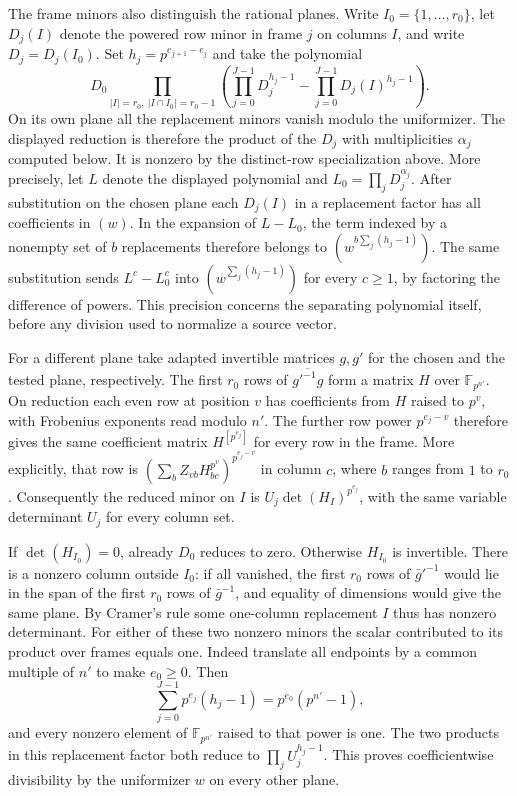 \documentclass[11pt]{amsart}
\theoremstyle{definition}
\theoremstyle{remark}
\begin{document}
The frame minors also distinguish the rational planes. Write
$I_0=\{1,\ldots,r_0\}$, let $D_j(I)$ denote the powered row
minor in frame $j$ on columns $I$, and write $D_j=D_j(I_0)$.
Set $h_j=p^{e_{j+1}-e_j}$ and take the polynomial
\[
 D_0\prod_{|I|=r_0,\ |I\cap I_0|=r_0-1}
 \left(\prod_{j=0}^{J-1}D_j^{h_j-1}
       -\prod_{j=0}^{J-1}D_j(I)^{h_j-1}\right).
\]
On its own plane all the replacement minors vanish modulo the
uniformizer. The displayed reduction is therefore the product
of the $D_j$ with multiplicities $\alpha_j$ computed below.
It is nonzero by the distinct-row specialization above.
More precisely, let $L$ denote the displayed polynomial and
$L_0=\prod_jD_j^{\alpha_j}$. After substitution on the chosen
plane each $D_j(I)$ in a replacement factor has all coefficients
in $(w)$. In the expansion of $L-L_0$, the term indexed by a
nonempty set of $b$ replacements therefore belongs to
$(w^{b\sum_j(h_j-1)})$. The same substitution sends
$L^c-L_0^c$ into $(w^{\sum_j(h_j-1)})$ for every $c\ge1$, by
factoring the difference of powers. This precision concerns
the separating polynomial itself, before any division used to
normalize a source vector.

For a different plane take adapted invertible matrices $g,g'$ for
the chosen and the tested plane, respectively. The first $r_0$
rows of $\overline{g'^{-1}g}$ form a matrix $H$ over
$\mathbb F_{p^{n'}}$. On reduction each even row at position $v$
has coefficients from $H$ raised to $p^v$, with Frobenius
exponents read modulo $n'$. The further row power $p^{e_j-v}$
therefore gives the same coefficient matrix $H^{[p^{e_j}]}$
for every row in the frame. More explicitly, that row is
$(\sum_b Z_{vb}H_{bc}^{p^v})^{p^{e_j-v}}$ in column $c$,
where $b$ ranges from $1$ to $r_0$. Consequently the reduced
minor on $I$ is $U_j\det(H_I)^{p^{e_j}}$, with the same
variable determinant $U_j$ for every column set.

If $\det(H_{I_0})=0$, already $D_0$ reduces to zero. Otherwise
$H_{I_0}$ is invertible. There is a nonzero column outside
$I_0$: if all vanished, the first $r_0$ rows of $\bar g'^{-1}$
would lie in the span of the first $r_0$ rows of $\bar g^{-1}$,
and equality of dimensions would give the same plane. By Cramer's
rule some one-column replacement $I$ thus has nonzero determinant.
For either of these two nonzero minors the scalar contributed to
its product over frames equals one. Indeed translate all endpoints
by a common multiple of $n'$ to make $e_0\ge0$. Then
\[
 \sum_{j=0}^{J-1}p^{e_j}(h_j-1)
       =p^{e_0}(p^{n'}-1),
\]
and every nonzero element of $\mathbb F_{p^{n'}}$ raised to that
power is one. The two products in this replacement factor both
reduce to $\prod_j U_j^{h_j-1}$. This proves coefficientwise
divisibility by the uniformizer $w$ on every other plane.
\end{document}
